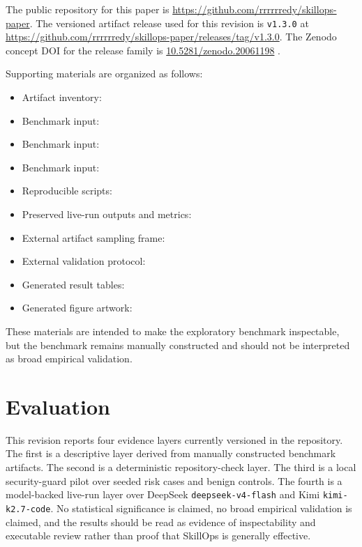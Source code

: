 \documentclass[11pt]{article}
\begin{document}
The public repository for this paper is
\url{https://github.com/rrrrrredy/skillops-paper}. The versioned artifact
release used for this revision is \texttt{v1.3.0} at
\url{https://github.com/rrrrrredy/skillops-paper/releases/tag/v1.3.0}. The
Zenodo concept DOI for the release family is
\href{https://doi.org/10.5281/zenodo.20061198}{10.5281/zenodo.20061198}
\citep{luo2026skillopsartifact}.

Supporting materials are organized as follows:
\begin{itemize}[leftmargin=*]
    \item Artifact inventory: 
    \item Benchmark input: 
    \item Benchmark input: 
    \item Benchmark input: 
    \item Reproducible scripts: 
    \item Preserved live-run outputs and metrics: 
    \item External artifact sampling frame:
    \item External validation protocol:
    \item Generated result tables: 
    \item Generated figure artwork: 
\end{itemize}

These materials are intended to make the exploratory benchmark inspectable,
but the benchmark remains manually constructed and should not be interpreted as
broad empirical validation.

\section{Evaluation}
\label{sec:evaluation}

This revision reports four evidence layers currently versioned in the
repository. The first is a descriptive layer derived from manually constructed
benchmark artifacts. The second is a deterministic repository-check layer. The
third is a local security-guard pilot over seeded risk cases and benign
controls. The fourth is a model-backed live-run layer over DeepSeek
\texttt{deepseek-v4-flash} and Kimi \texttt{kimi-k2.7-code}. No statistical
significance is claimed, no broad empirical validation is claimed, and the
results should be read as evidence of inspectability and executable review
rather than proof that SkillOps is generally effective.
\end{document}
